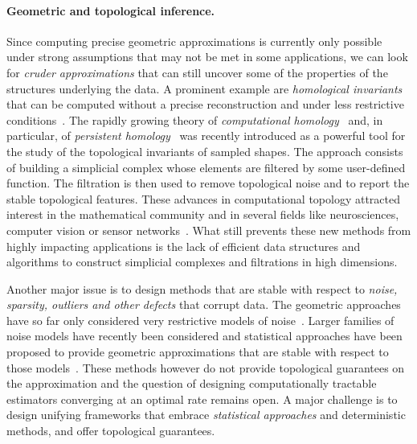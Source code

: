 \paragraph{Geometric and topological inference.}
Since computing precise geometric approximations is currently only possible under strong assumptions that may not be met in some applications, we can look for {\em cruder approximations }
that can still  uncover some of the properties of the structures underlying the data.
%
%
A prominent example are {\em homological invariants} that can be computed without a precise reconstruction and under less restrictive conditions~\cite{geometrica-ccl09,nsw-fhm-2008}. The rapidly growing theory of {\em computational homology}~\cite{kmm-ch-2003} and, in particular, of {\em persistent homology}~\cite{eh-ph-2008,rg-bptd-2008,az-tfc-2009} was recently introduced as a powerful tool for the study of the topological invariants of sampled shapes. The approach consists of building a simplicial complex whose elements are filtered by some user-defined function. The filtration is then used to remove topological noise and to report the stable topological features.  These advances in computational topology attracted interest in the mathematical community and in several fields like neurosciences, computer vision or sensor networks~\cite{fpgo-airc-2009,cids-lbsni-2008,dsrg-csnph-2007}.  What still prevents these new methods from highly impacting applications is the lack of efficient data structures and algorithms to construct simplicial complexes and filtrations in high dimensions.

Another major issue is to design methods that are stable with respect
to {\em noise, sparsity, outliers and other defects} that corrupt data. The geometric approaches have so far only considered very restrictive models of noise~\cite{nsw-fhm-2008}.  Larger families of noise models have recently been considered and statistical approaches have been proposed to provide geometric approximations that are stable with respect to those models~\cite{gpvw-mme-2011}. These methods however do not provide topological guarantees on the approximation and the question of designing computationally tractable estimators converging at an optimal rate remains open. A major challenge is to design unifying frameworks that embrace {\em statistical approaches} and deterministic methods, and offer topological guarantees.  

